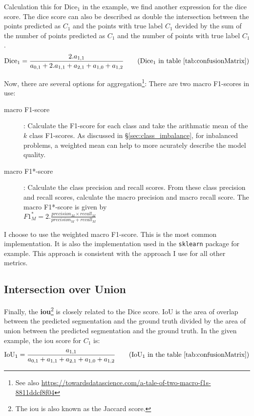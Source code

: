 Calculation this for Dice$_1$ in the example, we find another expression for the dice score.
The dice score can also be described as double the intersection between the points predicted as $C_1$ and the points with true label $C_1$ devided by the sum of the number of points predicted as $C_1$ and the number of points with true label $C_1$.
\begin{equation}
    \text{Dice}_1 = \frac{2.a_{1,1}}{a_{0,1} + 2.a_{1,1} + a_{2, 1} + a_{1,0} + a_{1,2}} \tag{Dice$_1$ in table \ref{tab:confusionMatrix}}
\end{equation}

Now, there are several options for aggregation\footnote{See also \url{https://towardsdatascience.com/a-tale-of-two-macro-f1s-8811ddcf8f04}}:
There are two macro F1-scores in use:
\begin{description}
    \item[macro F1-score]: Calculate the F1-score for each class and take the arithmatic mean of the $k$ class F1-scores. As discussed in §\ref{sec:class_imbalance}, for inbalanced problems, a weighted mean can help to more acurately describe the model quality.
    \item[macro F1*-score]: Calculate the class precision and recall scores. From these class precision and recall scores, calculate the macro precision and macro recall score. 
    The macro F1*-score is given by\\ $F1_M^*=2 . \frac{precision_M \times recall_M }{precision_M + recall_M }$
\end{description}

I choose to use the weighted macro F1-score. This is the most common implementation. It is also the implementation used in the \texttt{sklearn} package for example.
This approach is consistent with the approach I use for all other metrics. \\

\subsection{Intersection over Union}

Finally, the \textbf{\acrfull{iou}}\footnote{The \acrshort{iou} is also known as the Jaccard score.} is closely related to the Dice score.
IoU is the area of overlap between the predicted segmentation and the ground truth divided by the area of union between the predicted segmentation and the ground truth.
In the given example, the \acrshort{iou} score for $C_1$ is:
\begin{equation}
    \text{IoU}_1 = \frac{a_{1,1}}{a_{0,1}+a_{1,1}+a_{2,1}+a_{1,0}+a_{1,2}} \tag{IoU$_1$ in the table \ref{tab:confusionMatrix}}
\end{equation}

